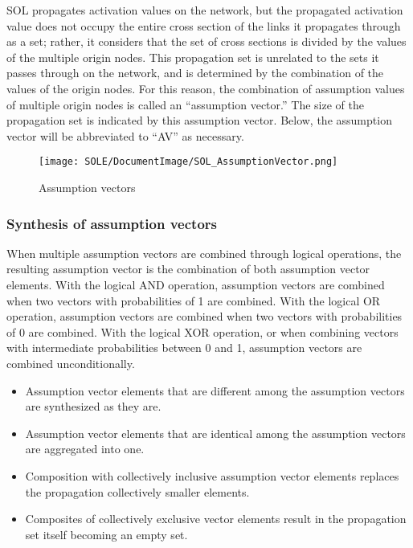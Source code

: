\documentclass[12pt]{article}
\begin{document}
SOL propagates activation values \hspace{0pt}\hspace{0pt}on the network,
but the propagated activation value does not occupy the entire cross
section of the links it propagates through as a set; rather, it
considers that the set of cross sections is divided by the values
\hspace{0pt}\hspace{0pt}of the multiple origin nodes. This propagation
set is unrelated to the sets it passes through on the network, and is
determined by the combination of the values \hspace{0pt}\hspace{0pt}of
the origin nodes. For this reason, the combination of assumption values
\hspace{0pt}\hspace{0pt}of multiple origin nodes is called an
``assumption vector.'' The size of the propagation set is indicated by
this assumption vector. Below, the assumption vector will be abbreviated
to ``AV'' as necessary.

\begin{figure}[ht]
  \centering
  \texttt{[image: SOLE/DocumentImage/SOL\_AssumptionVector.png]}
  \caption{Assumption vectors}
  \label{fig:assumption_vectors}
\end{figure}

\subsubsection{Synthesis of assumption vectors}\label{synthesis-of-assumption-vectors}

When multiple assumption vectors are combined through logical
operations, the resulting assumption vector is the combination of both
assumption vector elements. With the logical AND operation, assumption
vectors are combined when two vectors with probabilities of 1 are
combined. With the logical OR operation, assumption vectors are combined
when two vectors with probabilities of 0 are combined. With the logical
XOR operation, or when combining vectors with intermediate probabilities
between 0 and 1, assumption vectors are combined unconditionally.

\begin{itemize}
\item
  Assumption vector elements that are different among the assumption
  vectors are synthesized as they are.
\item
  Assumption vector elements that are identical among the assumption
  vectors are aggregated into one.
\item
  Composition with collectively inclusive assumption vector elements
  replaces the propagation collectively smaller elements.
\item
  Composites of collectively exclusive vector elements result in the
  propagation set itself becoming an empty set.
\end{itemize}
\end{document}
